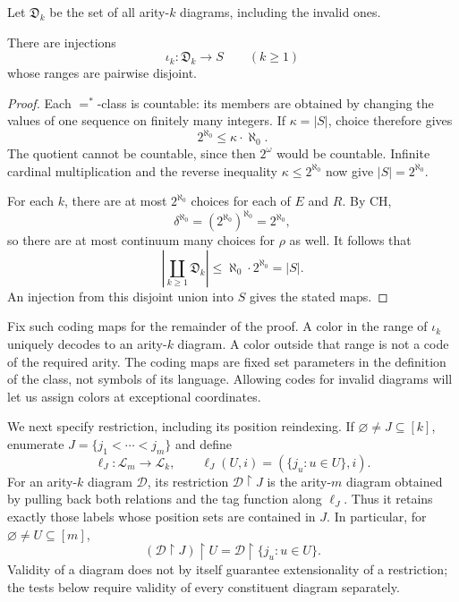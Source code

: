 Let \(\mathfrak D_k\) be the set of all arity-\(k\) diagrams,
including the invalid ones.

\begin{lemma}[Coding]\label{col:coding}
There are injections
\[
                  \iota_k:\mathfrak D_k\longrightarrow S
                  \qquad(k\ge1)
\]
whose ranges are pairwise disjoint.
\end{lemma}

\begin{proof}
Each \(=^*\)-class is countable: its members are obtained by changing
the values of one sequence on finitely many integers.  If
\(\kappa=|S|\), choice therefore gives
\[
                 2^{\aleph_0}\le\kappa\cdot\aleph_0.
\]
The quotient cannot be countable, since then \(2^\omega\) would be
countable.  Infinite cardinal multiplication and the reverse
inequality \(\kappa\le2^{\aleph_0}\) now give
\(|S|=2^{\aleph_0}\).

For each \(k\), there are at most \(2^{\aleph_0}\) choices for each
of \(E\) and \(R\).  By CH,
\[
 \delta^{\aleph_0}
   =(2^{\aleph_0})^{\aleph_0}
   =2^{\aleph_0},
\]
so there are at most continuum many choices for \(\rho\) as well.
It follows that
\[
 \left|\coprod_{k\ge1}\mathfrak D_k\right|
       \le\aleph_0\cdot2^{\aleph_0}=|S|.
\]
An injection from this disjoint union into \(S\) gives the stated
maps.
\end{proof}

Fix such coding maps for the remainder of the proof.  A color in
the range of \(\iota_k\) uniquely decodes to an arity-\(k\) diagram.
A color outside that range is not a code of the required arity.
The coding maps are fixed set parameters in the definition of the
class, not symbols of its language.  Allowing codes for invalid
diagrams will let us assign colors at exceptional coordinates.

We next specify restriction, including its position reindexing.
If \(\varnothing\ne J\subseteq[k]\), enumerate
\(J=\{j_1<\cdots<j_m\}\) and define
\[
 \ell_J:\mathcal L_m\longrightarrow\mathcal L_k,
 \qquad
 \ell_J(U,i)=(\{j_u:u\in U\},i).
\]
For an arity-\(k\) diagram \(\mathcal D\), its restriction
\(\mathcal D\restriction J\) is the arity-\(m\) diagram obtained
by pulling back both relations and the tag function along
\(\ell_J\).  Thus it retains exactly those labels whose position
sets are contained in \(J\).  In particular, for
\(\varnothing\ne U\subseteq[m]\),
\begin{equation}\label{col:restriction-composition}
 (\mathcal D\restriction J)\restriction U
       =\mathcal D\restriction\{j_u:u\in U\}.
\end{equation}
Validity of a diagram does not by itself guarantee extensionality
of a restriction; the tests below require validity of every
constituent diagram separately.


